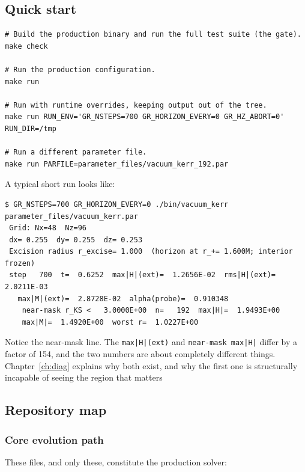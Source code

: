 \subsection{Quick start}

\begin{lstlisting}
# Build the production binary and run the full test suite (the gate).
make check

# Run the production configuration.
make run

# Run with runtime overrides, keeping output out of the tree.
make run RUN_ENV='GR_NSTEPS=700 GR_HORIZON_EVERY=0 GR_HZ_ABORT=0' RUN_DIR=/tmp

# Run a different parameter file.
make run PARFILE=parameter_files/vacuum_kerr_192.par
\end{lstlisting}

A typical short run looks like:

\begin{lstlisting}
$ GR_NSTEPS=700 GR_HORIZON_EVERY=0 ./bin/vacuum_kerr parameter_files/vacuum_kerr.par
 Grid: Nx=48  Nz=96
 dx= 0.255  dy= 0.255  dz= 0.253
 Excision radius r_excise= 1.000  (horizon at r_+= 1.600M; interior frozen)
 step   700  t=  0.6252  max|H|(ext)=  1.2656E-02  rms|H|(ext)=  2.0211E-03
   max|M|(ext)=  2.8728E-02  alpha(probe)=  0.910348
    near-mask r_KS <   3.0000E+00  n=   192  max|H|=  1.9493E+00
    max|M|=  1.4920E+00  worst r=  1.0227E+00
\end{lstlisting}

Notice the near-mask line. The \texttt{max|H|(ext)} and \texttt{near-mask
max|H|} differ by a factor of 154, and the two numbers are about completely
different things. Chapter~\ref{ch:diag} explains why both exist, and why the
first one is structurally incapable of seeing the region that matters
\subsection{Repository map}

\subsubsection{Core evolution path}

These files, and only these, constitute the production solver:

